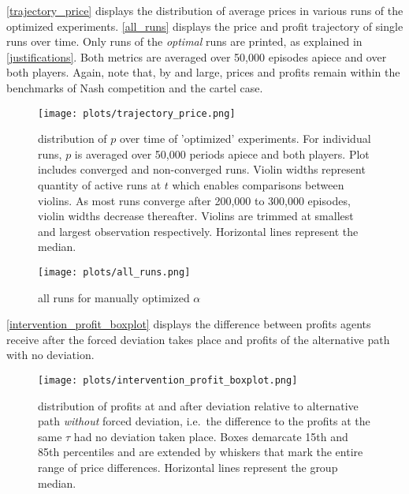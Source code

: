 \autoref{trajectory_price} displays the distribution of average prices in various runs of the optimized experiments. \autoref{all_runs} displays the price and profit trajectory of single runs over time. Only runs of the \emph{optimal} runs are printed, as explained in \autoref{justifications}. Both metrics are averaged over 50,000 episodes apiece and over both players. Again, note that, by and large, prices and profits remain within the benchmarks of Nash competition and the cartel case.


\begin{figure}
	\texttt{[image: plots/trajectory\_price.png]}
	\caption{distribution of $p$ over time of 'optimized' experiments. For individual runs, $p$ is averaged over 50,000 periods apiece and both players. Plot includes converged and non-converged runs. Violin widths represent quantity of active runs at $t$ which enables comparisons between violins. As most runs converge after 200,000 to 300,000 episodes, violin widths decrease thereafter. Violins are trimmed at smallest and largest observation respectively. Horizontal lines represent the median.}
	\label{trajectory_price}
\end{figure}

\begin{figure}
	\texttt{[image: plots/all\_runs.png]}
	\caption{all runs for manually optimized $\alpha$}
	\label{all_runs}
\end{figure}


\autoref{intervention_profit_boxplot} displays the difference between profits agents receive after the forced deviation takes place and profits of the alternative path with no deviation.

\begin{figure}
	\texttt{[image: plots/intervention\_profit\_boxplot.png]}
	\caption{distribution of profits at and after deviation relative to alternative path \emph{without} forced deviation, i.e.\ the difference to the profits at the same $\tau$ had no deviation taken place. Boxes demarcate 15th and 85th percentiles and are extended by whiskers that mark the entire range of price differences. Horizontal lines represent the group median.}
	\label{intervention_profit_boxplot}
\end{figure}


